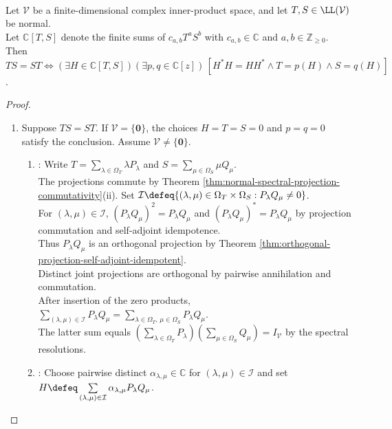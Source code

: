 \begin{corollary} \label{cor:commuting-normal-pair-generated-by-one-normal-operator} \\
Let $\mathcal{V}$ be a finite-dimensional complex inner-product space, and let $T,S\in\LL(\mathcal{V})$ be normal.\\
Let $\mathbb{C}[T,S]$ denote the finite sums of $c_{a,b}T^aS^b$ with $c_{a,b}\in\mathbb{C}$ and $a,b\in\mathbb{Z}_{\geq0}$.\\
Then $TS=ST\Longleftrightarrow(\exists H\in\mathbb{C}[T,S])(\exists p,q\in\mathbb{C}[z])\,[H^*H=HH^*\land T=p(H)\land S=q(H)]$.
\begin{proof}
\begin{enumerate}[label=\roman*.]
\setlength{\itemsep}{0pt}
\item[$(\Rightarrow)$] Suppose $TS=ST$. If $\mathcal{V}=\{\mathbf{0}\}$, the choices $H=T=S=0$ and $p=q=0$ satisfy the conclusion. Assume $\mathcal{V}\neq\{\mathbf{0}\}$.
\begin{enumerate}[label=(\alph*)]
\setlength{\itemsep}{0pt}
\item {}: Write $T=\sum\limits_{\lambda\in\Omega_T}\lambda P_{\lambda}$ and $S=\sum\limits_{\mu\in\Omega_S}\mu Q_{\mu}$.\\
The projections commute by Theorem \ref{thm:normal-spectral-projection-commutativity}(ii). Set $\mathcal{I}\defeq\{(\lambda,\mu)\in\Omega_T\times\Omega_S:P_{\lambda}Q_{\mu}\neq0\}$.\\
For $(\lambda,\mu)\in\mathcal{I}$, $(P_{\lambda}Q_{\mu})^2=P_{\lambda}Q_{\mu}$ and $(P_{\lambda}Q_{\mu})^*=P_{\lambda}Q_{\mu}$ by projection commutation and self-adjoint idempotence.\\
Thus $P_{\lambda}Q_{\mu}$ is an orthogonal projection by Theorem \ref{thm:orthogonal-projection-self-adjoint-idempotent}.\\
Distinct joint projections are orthogonal by pairwise annihilation and commutation.\\
After insertion of the zero products, $\sum\limits_{(\lambda,\mu)\in\mathcal{I}}P_{\lambda}Q_{\mu}=\sum\limits_{\lambda\in\Omega_T,\,\mu\in\Omega_S}P_{\lambda}Q_{\mu}$.\\
The latter sum equals $(\sum\limits_{\lambda\in\Omega_T}P_{\lambda})(\sum\limits_{\mu\in\Omega_S}Q_{\mu})=I_{\mathcal{V}}$ by the spectral resolutions.
\item {}: Choose pairwise distinct $\alpha_{\lambda,\mu}\in\mathbb{C}$ for $(\lambda,\mu)\in\mathcal{I}$ and set $H\defeq\sum\limits_{(\lambda,\mu)\in\mathcal{I}}\alpha_{\lambda,\mu}P_{\lambda}Q_{\mu}$.\\

\end{enumerate}
\end{enumerate}
\end{proof}
\end{corollary}
